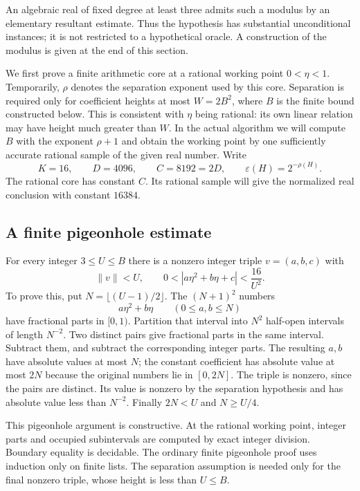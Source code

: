 An algebraic real of fixed degree at least three admits such a modulus by
an elementary resultant estimate.  Thus the hypothesis has substantial
unconditional instances; it is not restricted to a hypothetical oracle.
A construction of the modulus is given at the end of this section.

We first prove a finite arithmetic core at a rational working point
$0<\eta<1$.  Temporarily, $\rho$ denotes the separation exponent used
by this core.  Separation is required only for coefficient heights at most
$W=2B^2$, where $B$ is the finite bound constructed below.  This is
consistent with $\eta$ being rational: its own linear relation may have
height much greater than $W$.  In the actual algorithm we will compute
$B$ with the exponent $\rho+1$ and obtain the working point by one
sufficiently accurate rational sample of the given real number.  Write
\[
 K=16,\qquad D=4096,\qquad C=8192=2D,\qquad
 \varepsilon(H)=2^{-\rho(H)}.
\]
The rational core has constant $C$.  Its rational sample will give the
normalized real conclusion with constant $16384$.

\subsection{A finite pigeonhole estimate}

For every integer $3\leq U\leq B$ there is a nonzero integer triple
$v=(a,b,c)$ with
\begin{equation}\label{eq:ds-dirichlet}
 \|v\|<U,\qquad 0<|a\eta^2+b\eta+c|<\frac{16}{U^2}.
\end{equation}
To prove this, put $N=\lfloor(U-1)/2\rfloor$.  The $(N+1)^2$ numbers
\[
 a\eta^2+b\eta\qquad(0\leq a,b\leq N)
\]
have fractional parts in $[0,1)$.  Partition that interval into $N^2$
half-open intervals of length $N^{-2}$.  Two distinct pairs give fractional
parts in the same interval.  Subtract them, and subtract the corresponding
integer parts.  The resulting $a,b$ have absolute values at most $N$;
the constant coefficient has absolute value at most $2N$ because the
original numbers lie in $[0,2N]$.  The triple is nonzero, since the pairs
are distinct.  Its value is nonzero by the separation hypothesis and has
absolute value less than $N^{-2}$.  Finally $2N<U$ and $N\geq U/4$.

This pigeonhole argument is constructive.  At the rational working point,
integer parts and occupied subintervals are computed by exact integer
division.  Boundary equality is decidable.  The ordinary finite
pigeonhole proof uses induction only on finite lists.  The separation
assumption is needed only for the final nonzero triple, whose height is
less than $U\leq B$.

